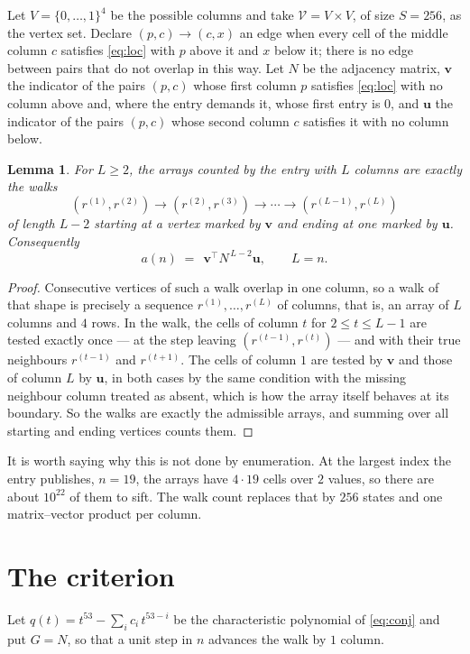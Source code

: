 \documentclass[11pt,a4paper]{article}
\theoremstyle{plain}
\newtheorem{lemma}[theorem]{Lemma}
\theoremstyle{definition}
\begin{document}
Let $V=\{0,\dots,1\}^{4}$ be the possible columns and take
$\mathcal V=V\times V$, of size $S=256$, as the vertex set. Declare $(p,c)\to(c,x)$ an edge
when every cell of the middle column $c$ satisfies \eqref{eq:loc} with $p$ above it and $x$
below it; there is no edge between pairs that do not overlap in this way. Let $N$ be the
adjacency matrix, $\mathbf{v}$ the indicator of the pairs $(p,c)$ whose first column $p$
satisfies \eqref{eq:loc} with no column above and, where the entry demands it, whose first entry is $0$, and $\mathbf{u}$ the indicator of
the pairs $(p,c)$ whose second column $c$ satisfies it with no column below.

\begin{lemma}\label{lem:walk}
For $L\ge2$, the arrays counted by the entry with $L$ columns are exactly the walks
\[
(r^{(1)},r^{(2)})\to(r^{(2)},r^{(3)})\to\cdots\to(r^{(L-1)},r^{(L)})
\]
of length $L-2$ starting at a vertex marked by $\mathbf{v}$ and ending at one marked by
$\mathbf{u}$. Consequently
\[
a(n)\;=\;\,\mathbf{v}^{\!\top}N^{\,L-2}\mathbf{u},\qquad L=n .
\]
\end{lemma}

\begin{proof}
Consecutive vertices of such a walk overlap in one column, so a walk of that shape is
precisely a sequence $r^{(1)},\dots,r^{(L)}$ of columns, that is, an array of $L$ columns
and $4$ rows. In the walk, the cells of column $t$ for $2\le t\le L-1$ are tested
exactly once --- at the step leaving $(r^{(t-1)},r^{(t)})$ --- and with their true
neighbours $r^{(t-1)}$ and $r^{(t+1)}$. The cells of column $1$ are tested by
$\mathbf{v}$ and those of column $L$ by $\mathbf{u}$, in both cases by the same condition
with the missing neighbour column treated as absent, which is how the array itself behaves at
its boundary. So the walks are exactly the admissible arrays, and summing over all starting
and ending vertices counts them.
\end{proof}


It is worth saying why this is not done by enumeration. At the largest index the entry
publishes, $n=19$, the arrays have $4\cdot19$ cells over
$2$ values, so there are about $10^{22}$ of them to sift. The
walk count replaces that by $256$ states and one matrix--vector product per column.
\section{The criterion}

Let $q(t)=t^{53}-\sum_i c_i\,t^{53-i}$ be the characteristic polynomial of
\eqref{eq:conj} and put $G=N$, so that a unit step in $n$ advances the walk by
$1$ column.
\end{document}
